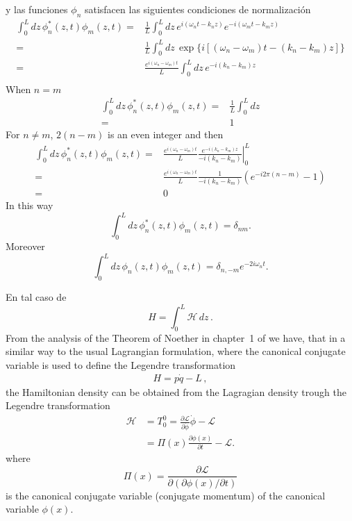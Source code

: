 y las funciones $\phi_n$ satisfacen las siguientes condiciones de normalizaci\'on
\begin{align}
  \int_0^Ldz\,\phi_n^*(z,t)\phi_m(z,t)=&\frac{1}{L}\int_0^Ldz\,e^{i(\omega_n t-k_n z)}e^{-i(\omega_m t-k_m z)}\nonumber\\
=&\frac{1}{L}\int_0^Ldz\,\exp\{i[(\omega_n-\omega_m) t-(k_n-k_m) z]\}\nonumber\\
=&\frac{e^{i(\omega_n-\omega_m)t}}{L}\int_0^Ldz\,e^{-i(k_n-k_m) z}\nonumber\\
\end{align}
When $n=m$
\begin{align}
    \int_0^Ldz\,\phi_n^*(z,t)\phi_m(z,t)=&\frac{1}{L}\int_0^Ldz\nonumber\\
    =&1
\end{align}
For $n\neq m$, $2(n-m)$ is an even integer and then
\begin{align}
   \int_0^Ldz\,\phi_n^*(z,t)\phi_m(z,t)  =&\frac{e^{i(\omega_n-\omega_m)t}}{L}\left.
\frac{e^{-i(k_n-k_m) z}}{-i(k_n-k_m)}\right|_0^L\nonumber\\
=&\frac{e^{i(\omega_n-\omega_m)t}}{L}\frac{1}{-i(k_n-k_m)}
\left(e^{-i2\pi(n-m) }-1\right)\nonumber\\
=&0
\end{align}
In this way
\begin{equation}
\label{eq:7}
  \int_0^Ldz\,\phi_n^*(z,t)\phi_m(z,t)=\delta_{nm}.
\end{equation}
Moreover
\begin{equation}
\label{eq:8}
  \int_0^Ldz\,\phi_n(z,t)\phi_m(z,t)=\delta_{n,-m}e^{-2i\omega_nt}.
\end{equation}

En tal caso de 
\begin{equation}
  \label{eq:9}
  H=\int_{0}^{L}\mathcal{H}\,dz\,.
\end{equation}
From the analysis of the Theorem of Noether in chapter~1 of \cite{lsm} we have, that in a similar way to the usual Lagrangian formulation, where the canonical conjugate  variable is used to define the Legendre transformation
\begin{align}
  \label{eq:10}
  H=p \dot q-L\,,
\end{align}
the Hamiltonian density can be obtained from the Lagragian density trough the Legendre transformation
\begin{align}
\mathcal{H}&=T^0_0=\frac{\partial\mathcal{L}}{\partial\dot{\phi}}\dot{\phi}
      -\mathcal{L}\\
      &=\Pi(x)\frac{\partial\phi(x)}{\partial t}-\mathcal{L}.
\end{align}
where
\begin{equation}
\label{eq:11}
  \Pi(x)=\frac{\partial\mathcal{L}}{\partial(\partial\phi(x)/\partial t)}
\end{equation}
is the canonical conjugate variable (conjugate momentum) of  the canonical variable $\phi(x)$.

